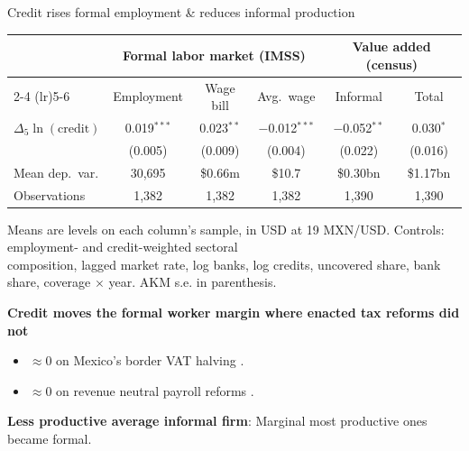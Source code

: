 \documentclass[aspectratio=169]{beamer}
\begin{document}
\begin{frame}{Credit rises formal employment \& reduces informal production}

\begin{center}
    {\small
    \begin{threeparttable}
        \begin{tabular}{lccccc}
            \toprule
             & \multicolumn{3}{c}{Formal labor market (IMSS)} & \multicolumn{2}{c}{Value added (census)} \\
            \cmidrule(lr){2-4} \cmidrule(lr){5-6}
             & Employment & Wage bill & Avg.\ wage & Informal & Total \\
            \midrule
            $\Delta_5 \ln(\text{credit})$ & 0.019$^{***}$ & 0.023$^{**}$ & $-$0.012$^{***}$ & $-$0.052$^{**}$ & 0.030$^{*}$ \\
             & (0.005) & (0.009) & (0.004) & (0.022) & (0.016) \\
            \addlinespace
            Mean dep.\ var. & 30{,}695 & \$0.66m & \$10.7 & \$0.30bn & \$1.17bn \\
            Observations             & 1{,}382  & 1{,}382 & 1{,}382 & 1{,}390 & 1{,}390 \\
            \bottomrule
        \end{tabular}
        \begin{tablenotes}[flushleft]
            \tiny
            \item Means are levels on each column's sample, in USD at 19 MXN/USD. Controls: employment- and credit-weighted sectoral \\
            composition, lagged market rate, log banks, log credits, uncovered share, bank share, coverage $\times$ year. AKM s.e. in parenthesis.
        \end{tablenotes}
    \end{threeparttable}
    }
\end{center}
\pause

\vspace{3mm}

\textbf{Credit moves the formal worker margin where enacted tax reforms did not} 
\begin{itemize}
    \item $\approx 0$ on Mexico's border VAT halving \textcolor{gray}{\cite{campos2020effects}}.
    \item $\approx 0$ on revenue neutral payroll reforms \textcolor{gray}{\cite{bobba2021labor}}.
\end{itemize}

\pause

\vspace{3mm}

\textbf{Less productive average informal firm}: Marginal most productive ones became formal.

\end{frame}
\end{document}

